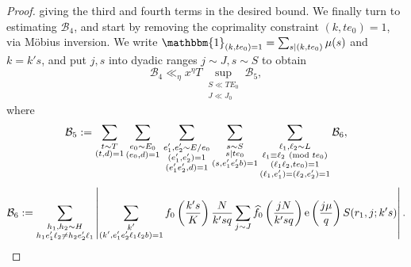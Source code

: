 \documentclass[reqno,11pt]{amsart}
\theoremstyle{definition}
\theoremstyle{remark}
\numberwithin{equation}{section}
\newcommand{\mB}{\mathcal{B}}
\newcommand{\e}{\textnormal{e}}
\newcommand{\one}{\mathbbm{1}}
\renewcommand{\hat}{\widehat}
\renewcommand{\pmod}[1]{\ (\textnormal{mod } #1)}
\begin{document}
\begin{proof}
giving the third and fourth terms in the desired bound.
We finally turn to estimating $\mB_4$, and start by removing the coprimality constraint $(k, te_0) = 1$, via M\"obius inversion. We write $\one_{(k, te_0) = 1} = \sum_{s \mid (k, te_0)} \mu(s)$ and $k = k' s$, and put $j, s$ into dyadic ranges $j \sim J, s \sim S$ to obtain %
\begin{equation} \label{eq:b4-estimate}
    \mB_4 \ll_\eta x^\eta T \sup_{\substack{S \ll TE_0 \\ J \ll J_0}} 
    \mB_5,
\end{equation}
where %
\begin{equation} \label{eq:b5-estimate}
    \mB_5 := 
    \sum_{\substack{t \sim T \\ (t, d) = 1}} \sum_{\substack{e_0 \sim E_0 \\ (e_0, d) = 1}}\, 
    \sum_{\substack{e_1', e_2' \sim E/e_0 \\ (e_1', e_2') = 1 \\ (e_1' e_2', d) = 1}}
    \sum_{\substack{s \sim S \\ s \mid te_0 \\ (s, e_1'e_2'b) = 1}}
    \sum_{\substack{\ell_1, \ell_2 \sim L \\ \ell_1 \equiv \ell_2 \pmod{te_0} \\ (\ell_1 \ell_2, te_0) = 1 \\ (\ell_1, e_1') = (\ell_2, e_2') = 1}}
    \mB_6,
\end{equation}
\[
    \mB_6 :=
    \sum_{\substack{h_1, h_2 \sim H \\ h_1e_1'\ell_2 \neq h_2e_2'\ell_1}}
    \left\vert
    \sum_{\substack{k' \\ (k', e_1'e_2'\ell_1\ell_2b) = 1}} 
    f_0\left(\frac{k's}{K}\right)
    \frac{N}{k'sq} \sum_{j \sim J} \hat{f_0}\left(\frac{jN}{k'sq}\right) \e\left(\frac{j\mu}{q}\right)
    S(r_1, j; k's)
    \right\vert.
\]


\end{proof}
\end{document}
